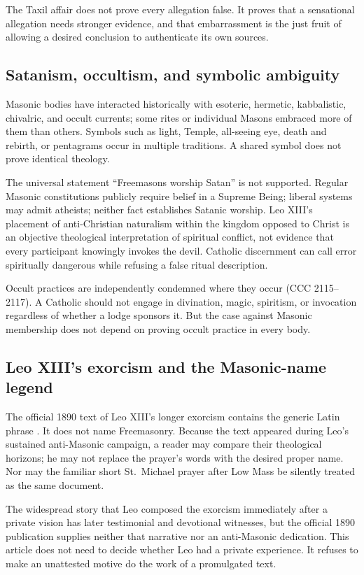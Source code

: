 The Taxil affair does not prove every allegation false. It proves that a sensational allegation needs stronger evidence, and that embarrassment is the just fruit of allowing a desired conclusion to authenticate its own sources.

\subsection{Satanism, occultism, and symbolic ambiguity}

Masonic bodies have interacted historically with esoteric, hermetic, kabbalistic, chivalric, and occult currents; some rites or individual Masons embraced more of them than others. Symbols such as light, Temple, all-seeing eye, death and rebirth, or pentagrams occur in multiple traditions. A shared symbol does not prove identical theology.

The universal statement “Freemasons worship Satan” is not supported. Regular Masonic constitutions publicly require belief in a Supreme Being; liberal systems may admit atheists; neither fact establishes Satanic worship. Leo XIII's placement of anti-Christian naturalism within the kingdom opposed to Christ is an objective theological interpretation of spiritual conflict, not evidence that every participant knowingly invokes the devil. Catholic discernment can call error spiritually dangerous while refusing a false ritual description.

Occult practices are independently condemned where they occur (CCC 2115--2117). A Catholic should not engage in divination, magic, spiritism, or invocation regardless of whether a lodge sponsors it. But the case against Masonic membership does not depend on proving occult practice in every body.

\subsection{Leo XIII's exorcism and the Masonic-name legend}

The official 1890 text of Leo XIII's longer exorcism contains the generic Latin phrase . It does not name Freemasonry. Because the text appeared during Leo's sustained anti-Masonic campaign, a reader may compare their theological horizons; he may not replace the prayer's words with the desired proper name. Nor may the familiar short St.~Michael prayer after Low Mass be silently treated as the same document.

The widespread story that Leo composed the exorcism immediately after a private vision has later testimonial and devotional witnesses, but the official 1890 publication supplies neither that narrative nor an anti-Masonic dedication. This article does not need to decide whether Leo had a private experience. It refuses to make an unattested motive do the work of a promulgated text.

